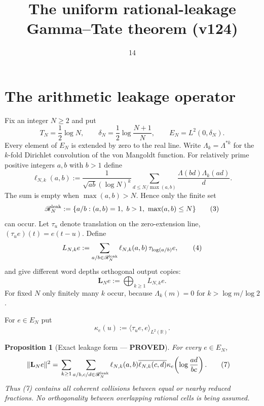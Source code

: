 \documentclass[11pt]{article}
\title{The uniform rational-leakage Gamma--Tate theorem (v124)}
\date{14}
\newcommand{\PROVED}{\textcolor{green!40!black}{\textbf{PROVED}}}
\newtheorem{proposition}{Proposition}
\begin{document}
\maketitle

\section{The arithmetic leakage operator}

Fix an integer $N\ge2$ and put
\begin{equation}
 T_N=\frac12\log N,
 \qquad
 \delta_N=\frac12\log\frac{N+1}{N},
 \qquad
 E_N=L^2(0,\delta_N).                                      \tag{1}
\end{equation}
Every element of $E_N$ is extended by zero to the real line.  Write
$\Lambda_k=\Lambda^{*k}$ for the $k$-fold Dirichlet convolution of the
von Mangoldt function.  For relatively prime positive integers $a,b$ with
$b>1$ define
\begin{equation}
 \ell_{N,k}(a,b)
 :=\frac1{\sqrt{ab}(\log N)^k}
 \sum_{d\le N/\max(a,b)}
       \frac{\Lambda(bd)\Lambda_k(ad)}d.                    \tag{2}
\end{equation}
The sum is empty when $\max(a,b)>N$.  Hence only the finite set
\begin{equation}
 \mathscr R_N^{\rm leak}
 :=\{a/b:(a,b)=1,\ b>1,\ \max(a,b)\le N\}                 \tag{3}
\end{equation}
can occur.  Let $\tau_u$ denote translation on the zero-extension line,
$(\tau_ue)(t)=e(t-u)$.  Define
\begin{equation}
 L_{N,k}e
 :=\sum_{a/b\in\mathscr R_N^{\rm leak}}
       \ell_{N,k}(a,b)\,\tau_{\log(a/b)}e,                 \tag{4}
\end{equation}
and give different word depths orthogonal output copies:
\begin{equation}
 \mathbf L_Ne:=\bigoplus_{k\ge1}L_{N,k}e.
                                                                    \tag{5}
\end{equation}
For fixed $N$ only finitely many $k$ occur, because
$\Lambda_k(m)=0$ for $k>\log m/\log2$.

For $e\in E_N$ put
\begin{equation}
 \kappa_e(u):=\langle\tau_ue,e\rangle_{L^2(\mathbb R)}.    \tag{6}
\end{equation}

\begin{proposition}[Exact leakage form --- \PROVED]
For every $e\in E_N$,
\begin{align}
 \|\mathbf L_Ne\|^2
 ={}&\sum_{k\ge1}
 \sum_{a/b,c/d\in\mathscr R_N^{\rm leak}}
 \ell_{N,k}(a,b)\overline{\ell_{N,k}(c,d)}
 \kappa_e\!\left(\log\frac{ad}{bc}\right).               \tag{7}
\end{align}
Thus (7) contains all coherent collisions between equal or nearby reduced
fractions.  No orthogonality between overlapping rational cells is being
assumed.
\end{proposition}
\end{document}
